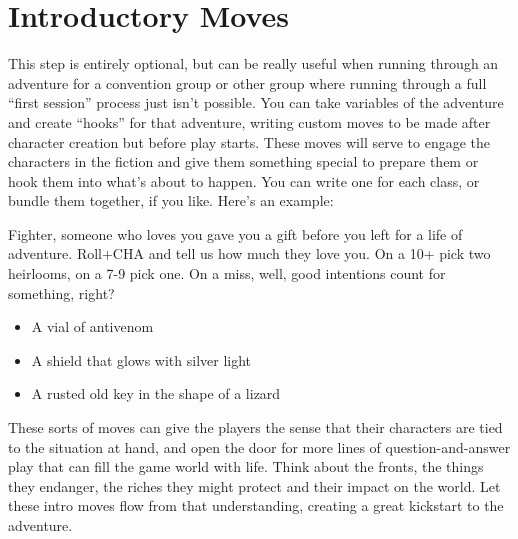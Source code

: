 \section*{Introductory Moves}


 This step is entirely optional, but can be really useful when running through an adventure for a convention group or other group where running through a full ``first session'' process just isn't possible. You can take variables of the adventure and create ``hooks'' for that adventure, writing custom moves to be made after character creation but before play starts. These moves will serve to engage the characters in the fiction and give them something special to prepare them or hook them into what's about to happen. You can write one for each class, or bundle them together, if you like. Here's an example:


 Fighter, someone who loves you gave you a gift before you left for a life of adventure. Roll+CHA and tell us how much they love you. On a 10+ pick two heirlooms, on a 7-9 pick one. On a miss, well, good intentions count for something, right?
\begin{itemize}
\item A vial of antivenom
\item A shield that glows with silver light
\item A rusted old key in the shape of a lizard

\end{itemize}


 These sorts of moves can give the players the sense that their characters are tied to the situation at hand, and open the door for more lines of question-and-answer play that can fill the game world with life. Think about the fronts, the things they endanger, the riches they might protect and their impact on the world. Let these intro moves flow from that understanding, creating a great kickstart to the adventure.


